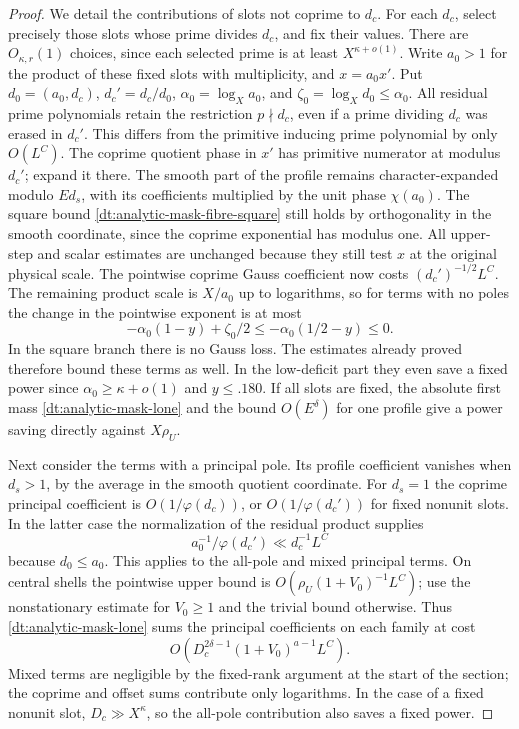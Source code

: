 \documentclass[11pt,a4paper]{article}
\theoremstyle{paperplain}
\numberwithin{equation}{section}
\begin{document}
\begin{proof}
We detail the contributions of slots not coprime to \(d_c\).
For each \(d_c\), select precisely those slots whose prime
divides \(d_c\), and fix their values. There are
\(O_{\kappa,r}(1)\) choices, since each selected prime is at
least \(X^{\kappa+o(1)}\). Write \(a_0>1\) for the product of
these fixed slots with multiplicity, and \(x=a_0 x'\).
Put \(d_0=(a_0,d_c)\), \(d_c'=d_c/d_0\),
\(\alpha_0=\log_X a_0\), and \(\zeta_0=\log_Xd_0\le\alpha_0\).
All residual prime polynomials retain the restriction \(p\nmid d_c\),
even if a prime dividing \(d_c\) was erased in \(d_c'\).
This differs from the primitive inducing prime polynomial by
only \(O(L^C)\). The coprime quotient phase in \(x'\) has
primitive numerator at modulus \(d_c'\); expand it there.
The smooth part of the profile remains character-expanded
modulo \(Ed_s\), with its coefficients multiplied by the unit
phase \(\chi(a_0)\). The square bound
\eqref{dt:analytic-mask-fibre-square} still holds by orthogonality
in the smooth coordinate, since the coprime exponential has
modulus one. All upper-step and scalar estimates are unchanged
because they still test \(x\) at the original physical scale.
The pointwise coprime Gauss coefficient now costs
\((d_c')^{-1/2}L^C\). The remaining product scale is \(X/a_0\)
up to logarithms, so for terms with no poles the change in the
pointwise exponent is at most
\[
          -\alpha_0(1-y)+\zeta_0/2
                    \le -\alpha_0(1/2-y)\le0 .
\]
In the square branch there is no Gauss loss. The estimates
already proved therefore bound these terms as well.
In the low-deficit part they even save a fixed power since
\(\alpha_0\ge\kappa+o(1)\) and \(y\le .180\).
If all slots are fixed, the absolute first mass
\eqref{dt:analytic-mask-lone} and the bound \(O(E^\delta)\)
for one profile give a power saving directly against \(X\rho_U\).

Next consider the terms with a principal pole. Its profile
coefficient vanishes when \(d_s>1\), by the average in the
smooth quotient coordinate. For \(d_s=1\) the coprime principal
coefficient is \(O(1/\varphi(d_c))\), or
\(O(1/\varphi(d_c'))\) for fixed nonunit slots. In the latter
case the normalization of the residual product supplies
\[
             a_0^{-1}/\varphi(d_c')
                      \ll d_c^{-1}L^C
\]
because \(d_0\le a_0\). This applies to the all-pole and mixed
principal terms. On central shells the pointwise upper bound
is \(O(\rho_U(1+V_0)^{-1}L^C)\); use the nonstationary
estimate for \(V_0\ge1\) and the trivial bound otherwise.
Thus \eqref{dt:analytic-mask-lone} sums the principal coefficients
on each family at cost
\[
             O(D_c^{2\delta-1}(1+V_0)^{a-1}L^C).
\]
Mixed terms are negligible by the fixed-rank argument at the start
of the section; the coprime and offset sums contribute only
logarithms. In the case of a fixed nonunit slot, \(D_c\gg X^\kappa\),
so the all-pole contribution also saves a fixed power.


\end{proof}
\end{document}
